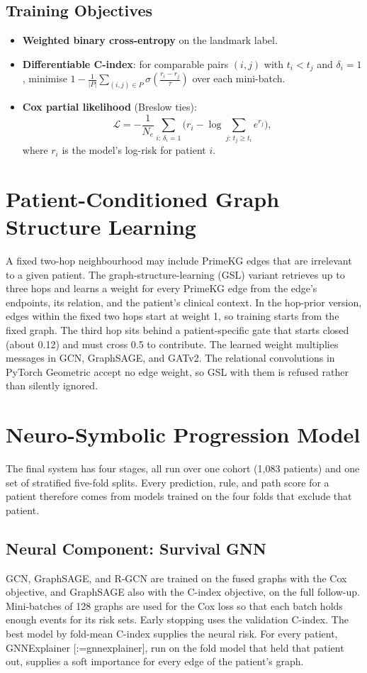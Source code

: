 \documentclass{mnnit}
\makeatletter
\newcommand{\rc}[1]{[\def\rc@sep{}\@for\rc@key:=#1\do{\rc@sep\ref{ref:\rc@key}\def\rc@sep{, }}]}
\makeatother
\begin{document}
\subsection{Training Objectives}
\begin{itemize}
  \item \textbf{Weighted binary cross-entropy} on the landmark label.
  \item \textbf{Differentiable C-index}: for comparable pairs $(i,j)$ with $t_i < t_j$ and $\delta_i = 1$, minimise
        $1 - \frac{1}{|P|}\sum_{(i,j)\in P}\sigma\!\left(\frac{r_i - r_j}{\tau}\right)$ over each mini-batch.
  \item \textbf{Cox partial likelihood} (Breslow ties):
  \begin{equation}
    \mathcal{L} = -\frac{1}{N_e}\sum_{i:\,\delta_i=1}\Big(r_i - \log\!\!\sum_{j:\,t_j \ge t_i}\! e^{r_j}\Big),
  \end{equation}
  where $r_i$ is the model's log-risk for patient $i$.
\end{itemize}

\section{Patient-Conditioned Graph Structure Learning}
A fixed two-hop neighbourhood may include PrimeKG edges that are irrelevant to a given patient. The
graph-structure-learning (GSL) variant retrieves up to three hops and learns a weight for every PrimeKG edge from
the edge's endpoints, its relation, and the patient's clinical context. In the hop-prior version, edges within the
fixed two hops start at weight 1, so training starts from the fixed graph. The third hop sits behind a
patient-specific gate that starts closed (about 0.12) and must cross 0.5 to contribute. The learned weight
multiplies messages in GCN, GraphSAGE, and GATv2. The relational convolutions in PyTorch Geometric accept no edge
weight, so GSL with them is refused rather than silently ignored.

\section{Neuro-Symbolic Progression Model}
The final system has four stages, all run over one cohort (1,083 patients) and one set of stratified five-fold
splits. Every prediction, rule, and path score for a patient therefore comes from models trained on the four
folds that exclude that patient.

\subsection{Neural Component: Survival GNN}
GCN, GraphSAGE, and R-GCN are trained on the fused graphs with the Cox objective, and GraphSAGE also with the
C-index objective, on the full follow-up. Mini-batches of 128 graphs are used for the Cox loss so that each batch
holds enough events for its risk sets. Early stopping uses the validation C-index. The best model by fold-mean
C-index supplies the neural risk. For every patient, GNNExplainer \rc{gnnexplainer}, run on the fold model that
held that patient out, supplies a soft importance for every edge of the patient's graph.
\end{document}
